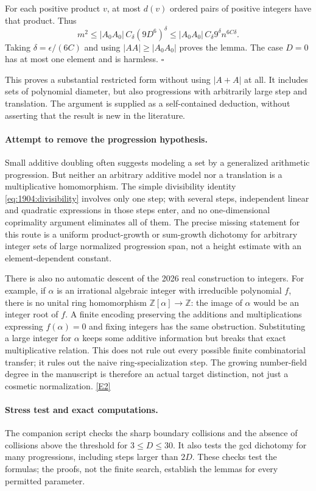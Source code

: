 \documentclass[11pt,a4paper]{article}
\newcommand{\Z}{\mathbb{Z}}
\newcommand{\eref}[2]{\hyperlink{extra:#1:#2}{[E#2]}}
\numberwithin{equation}{section}
\begin{document}
For each positive product $v$, at most $d(v)$ ordered pairs of positive
integers have that product. Thus
\[
 m^2\leq |A_0A_0|\,C_\delta(9D^6)^\delta
 \leq |A_0A_0|\,C_\delta9^\delta n^{6C\delta}.
\]
Taking $\delta=\epsilon/(6C)$ and using $|AA|\geq|A_0A_0|$ proves the
lemma. The case $D=0$ has at most one element and is harmless. $\square$

This proves a substantial restricted form without using $|A+A|$ at all.
It includes sets of polynomial diameter, but also progressions with
arbitrarily large step and translation. The argument is supplied as a
self-contained deduction, without asserting that the result is new in
the literature.

\paragraph{Attempt to remove the progression hypothesis.}
Small additive doubling often suggests modeling a set by a generalized
arithmetic progression. But neither an arbitrary additive model nor a
translation is a multiplicative homomorphism. The simple divisibility
identity \eqref{eq:1904:divisibility} involves only one step; with several
steps, independent linear and quadratic expressions in those steps enter,
and no one-dimensional coprimality argument eliminates all of them.
The precise missing statement for this route is a uniform product-growth
or sum-growth dichotomy for arbitrary integer sets of large normalized
progression span, not a height estimate with an element-dependent constant.

There is also no automatic descent of the 2026 real construction to
integers. For example, if $\alpha$ is an irrational algebraic integer with
irreducible polynomial $f$, there is no unital ring homomorphism
$\Z[\alpha]\to\Z$: the image of $\alpha$ would be an integer root of $f$.
A finite encoding preserving the additions and multiplications expressing
$f(\alpha)=0$ and fixing integers has the same obstruction. Substituting
a large integer for $\alpha$ keeps some additive information but breaks
that exact multiplicative relation. This does not rule out every possible
finite combinatorial transfer; it rules out the naive ring-specialization
step. The growing number-field degree in the manuscript is therefore an
actual target distinction, not just a cosmetic normalization.
\eref{1904}{2}

\paragraph{Stress test and exact computations.}
The companion script checks the sharp boundary collisions and the absence
of collisions above the threshold for $3\leq D\leq30$. It also tests the
gcd dichotomy for many progressions, including steps larger than $2D$.
These checks test the formulas; the proofs, not the finite search, establish
the lemmas for every permitted parameter.
\end{document}
